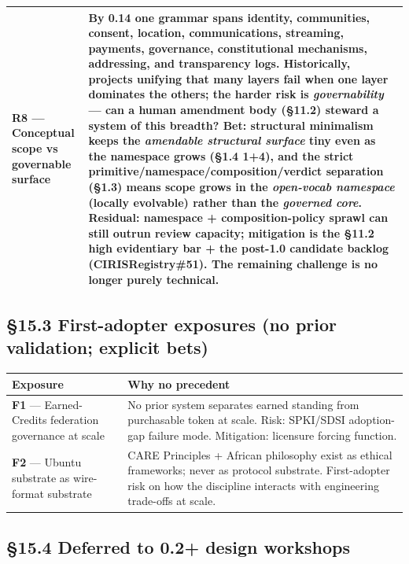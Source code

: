 \documentclass[10pt]{article}
\begin{document}
{\begin{longtable}{|p{8.0cm}|p{8.0cm}|}
\textbf{R8} — Conceptual scope vs governable surface & By 0.14 one grammar spans identity, communities, consent, location, communications, streaming, payments, governance, constitutional mechanisms, addressing, and transparency logs. Historically, projects unifying that many layers fail when one layer dominates the others; the harder risk is \textit{governability} — can a human amendment body (§11.2) steward a system of this breadth? \textbf{Bet}: structural minimalism keeps the \textit{amendable structural surface} tiny even as the namespace grows (§1.4 1+4), and the strict primitive/namespace/composition/verdict separation (§1.3) means scope grows in the \textit{open-vocab namespace} (locally evolvable) rather than the \textit{governed core}. \textbf{Residual}: namespace + composition-policy sprawl can still outrun review capacity; mitigation is the §11.2 high evidentiary bar + the post-1.0 candidate backlog (CIRISRegistry\#51). The remaining challenge is no longer purely technical. \\ \hline
\end{longtable}}


\subsection*{§15.3 First-adopter exposures (no prior validation; explicit bets)}


{\footnotesize
\begin{longtable}{|p{8.0cm}|p{8.0cm}|}\hline
\textbf{Exposure} & \textbf{Why no precedent} \\ \hline\endhead
\textbf{F1} — Earned-Credits federation governance at scale & No prior system separates earned standing from purchasable token at scale. Risk: SPKI/SDSI adoption-gap failure mode. Mitigation: licensure forcing function. \\ \hline
\textbf{F2} — Ubuntu substrate as wire-format substrate & CARE Principles + African philosophy exist as ethical frameworks; never as protocol substrate. First-adopter risk on how the discipline interacts with engineering trade-offs at scale. \\ \hline
\end{longtable}}


\subsection*{§15.4 Deferred to 0.2+ design workshops}
\end{document}
